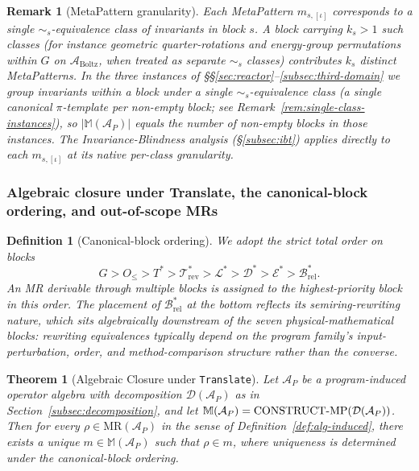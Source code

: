 \documentclass[manuscript]{acmart}
\newtheorem{theorem}{Theorem}
\newtheorem{definition}{Definition}
\newtheorem{remark}{Remark}
\begin{document}
\begin{remark}[MetaPattern granularity]
\label{rem:mp-per-class}
Each MetaPattern $m_{s,[\iota]}$ corresponds to a single $\sim_s$-equivalence class of invariants in block $s$. A block carrying $k_s > 1$ such classes (for instance geometric quarter-rotations and energy-group permutations within $G$ on $\mathcal{A}_{\mathrm{Boltz}}$, when treated as separate $\sim_s$ classes) contributes $k_s$ distinct MetaPatterns. In the three instances of \S\S\ref{sec:reactor}--\ref{subsec:third-domain} we group invariants within a block under a single $\sim_s$-equivalence class (a single canonical $\pi$-template per non-empty block; see Remark~\ref{rem:single-class-instances}), so $|\mathbb{M}(\mathcal{A}_{P})|$ equals the number of non-empty blocks in those instances. The Invariance-Blindness analysis (\S\ref{subsec:ibt}) applies directly to each $m_{s,[\iota]}$ at its native per-class granularity.
\end{remark}

\subsubsection{Algebraic closure under Translate, the canonical-block ordering, and out-of-scope MRs}
\label{subsec:completeness}

\begin{definition}[Canonical-block ordering]
\label{def:canonical-order}
We adopt the strict total order on blocks
$$G > O_{\le} > T^{*} > \mathcal{T}^{*}_{\mathrm{rev}} > \mathcal{L}^{*} > \mathcal{D}^{*} > \mathcal{E}^{*} > \mathcal{B}^{*}_{\mathrm{rel}}.$$
An MR derivable through multiple blocks is assigned to the highest-priority block in this order. The placement of $\mathcal{B}^{*}_{\mathrm{rel}}$ at the bottom reflects its semiring-rewriting nature, which sits algebraically downstream of the seven physical-mathematical blocks: rewriting equivalences typically depend on the program family's input-perturbation, order, and method-comparison structure rather than the converse.
\end{definition}

\begin{theorem}[Algebraic Closure under \texttt{Translate}]
\label{thm:closure}
Let $\mathcal{A}_P$ be a program-induced operator algebra with decomposition $\mathcal{D}(\mathcal{A}_P)$ as in Section~\ref{subsec:decomposition}, and let $\mathbb{M}(\mathcal{A}_P) = \mathrm{CONSTRUCT\textnormal{-}MP}(\mathcal{D}(\mathcal{A}_P))$. Then for every $\rho \in \mathrm{MR}(\mathcal{A}_P)$ in the sense of Definition~\ref{def:alg-induced}, there exists a unique $m \in \mathbb{M}(\mathcal{A}_P)$ such that $\rho \in m$, where uniqueness is determined under the canonical-block ordering.
\end{theorem}
\end{document}
